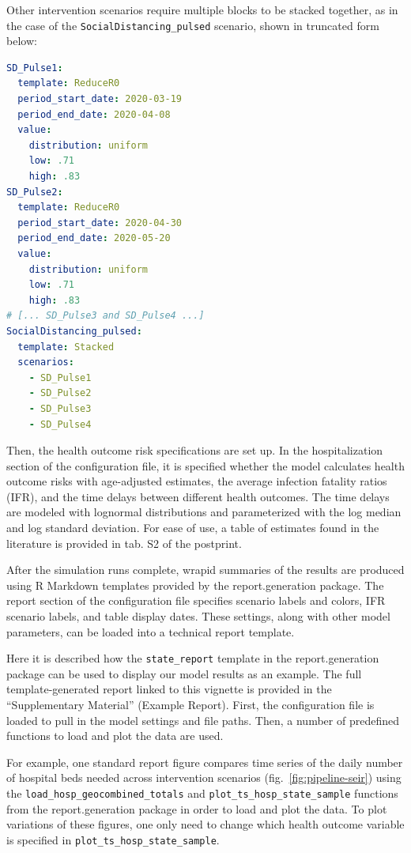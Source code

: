 Other intervention scenarios require multiple blocks to be stacked together, as in the case of the \verb|SocialDistancing_pulsed| scenario, shown in truncated form below: 

\begin{lstlisting}[language=yaml]
SD_Pulse1: 
  template: ReduceR0 
  period_start_date: 2020-03-19 
  period_end_date: 2020-04-08 
  value: 
    distribution: uniform 
    low: .71 
    high: .83 
SD_Pulse2: 
  template: ReduceR0 
  period_start_date: 2020-04-30 
  period_end_date: 2020-05-20 
  value: 
    distribution: uniform
    low: .71 
    high: .83 
# [... SD_Pulse3 and SD_Pulse4 ...]
SocialDistancing_pulsed: 
  template: Stacked 
  scenarios: 
    - SD_Pulse1 
    - SD_Pulse2
    - SD_Pulse3
    - SD_Pulse4
\end{lstlisting}

Then, the health outcome risk specifications are set up. In the hospitalization section of the configuration file, it is specified whether the model calculates health outcome risks with age-adjusted estimates, the average infection fatality ratios (IFR), and the time delays between different health outcomes. The time delays are modeled with lognormal distributions and parameterized with the log median and log standard deviation. For ease of use, a table of estimates found in the literature is provided in tab. S2 of the postprint.

After the simulation runs complete, wrapid summaries of the results are produced using R Markdown templates provided by the report.generation package. The report section of the configuration file specifies scenario labels and colors, IFR scenario labels, and table display dates. These settings, along with other model parameters, can be loaded into a technical report template.

Here it is described how the \verb|state_report| template in the report.generation package can be used to display our model results as an example. The full template-generated report linked to this vignette is provided in the “Supplementary Material” (Example Report). First, the configuration file is loaded to pull in the model settings and file paths. Then, a number of predefined functions to load and plot the data are used.

For example, one standard report figure compares time series of the daily number of hospital beds needed across intervention scenarios (fig.~\ref{fig:pipeline-seir}) using the \verb|load_hosp_geocombined_totals| and \verb|plot_ts_hosp_state_sample| functions from the report.generation package in order to load and plot the data. To plot variations of these figures, one only need to change which health outcome variable is specified in \verb|plot_ts_hosp_state_sample|.

